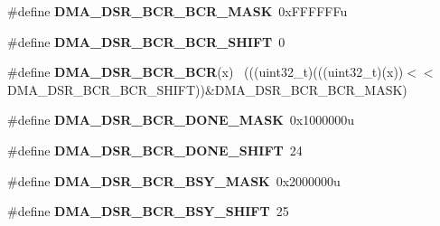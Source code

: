 \begin{DoxyCompactItemize}
\item 
\hypertarget{group___d_m_a___register___masks_ga51f1a407dbca889f0b21bb1eeaa1c5d0}{}\#define {\bfseries D\+M\+A\+\_\+\+D\+S\+R\+\_\+\+B\+C\+R\+\_\+\+B\+C\+R\+\_\+\+M\+A\+S\+K}~0x\+F\+F\+F\+F\+F\+Fu\label{group___d_m_a___register___masks_ga51f1a407dbca889f0b21bb1eeaa1c5d0}

\item 
\hypertarget{group___d_m_a___register___masks_ga7eb36602370f4118640f57d51913ff89}{}\#define {\bfseries D\+M\+A\+\_\+\+D\+S\+R\+\_\+\+B\+C\+R\+\_\+\+B\+C\+R\+\_\+\+S\+H\+I\+F\+T}~0\label{group___d_m_a___register___masks_ga7eb36602370f4118640f57d51913ff89}

\item 
\hypertarget{group___d_m_a___register___masks_ga8053d32b4561ea43f67ad34a59db1afe}{}\#define {\bfseries D\+M\+A\+\_\+\+D\+S\+R\+\_\+\+B\+C\+R\+\_\+\+B\+C\+R}(x)                                          ~(((uint32\+\_\+t)(((uint32\+\_\+t)(x))$<$$<$D\+M\+A\+\_\+\+D\+S\+R\+\_\+\+B\+C\+R\+\_\+\+B\+C\+R\+\_\+\+S\+H\+I\+F\+T))\&D\+M\+A\+\_\+\+D\+S\+R\+\_\+\+B\+C\+R\+\_\+\+B\+C\+R\+\_\+\+M\+A\+S\+K)\label{group___d_m_a___register___masks_ga8053d32b4561ea43f67ad34a59db1afe}

\item 
\hypertarget{group___d_m_a___register___masks_gaaa733d9c65fb074a9e836b8abaa8173f}{}\#define {\bfseries D\+M\+A\+\_\+\+D\+S\+R\+\_\+\+B\+C\+R\+\_\+\+D\+O\+N\+E\+\_\+\+M\+A\+S\+K}~0x1000000u\label{group___d_m_a___register___masks_gaaa733d9c65fb074a9e836b8abaa8173f}

\item 
\hypertarget{group___d_m_a___register___masks_gaa9063734a56a62385b42210acedc3144}{}\#define {\bfseries D\+M\+A\+\_\+\+D\+S\+R\+\_\+\+B\+C\+R\+\_\+\+D\+O\+N\+E\+\_\+\+S\+H\+I\+F\+T}~24\label{group___d_m_a___register___masks_gaa9063734a56a62385b42210acedc3144}

\item 
\hypertarget{group___d_m_a___register___masks_ga517e206a9b5422e95b875d13973d6888}{}\#define {\bfseries D\+M\+A\+\_\+\+D\+S\+R\+\_\+\+B\+C\+R\+\_\+\+B\+S\+Y\+\_\+\+M\+A\+S\+K}~0x2000000u\label{group___d_m_a___register___masks_ga517e206a9b5422e95b875d13973d6888}

\item 
\hypertarget{group___d_m_a___register___masks_gaa9f53140b5fb6fbbf7cae9d4190bac47}{}\#define {\bfseries D\+M\+A\+\_\+\+D\+S\+R\+\_\+\+B\+C\+R\+\_\+\+B\+S\+Y\+\_\+\+S\+H\+I\+F\+T}~25\label{group___d_m_a___register___masks_gaa9f53140b5fb6fbbf7cae9d4190bac47}


\end{DoxyCompactItemize}
